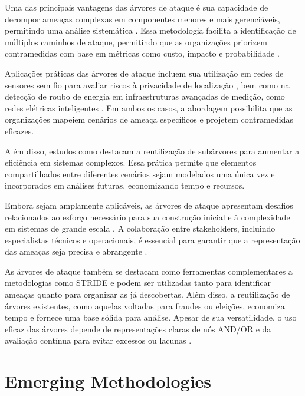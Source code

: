 Uma das principais vantagens das árvores de ataque é sua capacidade de
decompor ameaças complexas em componentes menores e mais gerenciáveis,
permitindo uma análise sistemática \cite{Energytheftdetectionissues}.
Essa metodologia facilita a identificação de múltiplos caminhos de
ataque, permitindo que as organizações priorizem contramedidas com
base em métricas como custo, impacto e probabilidade
\cite{AnAttackTreeBasedRisk}.

Aplicações práticas das árvores de ataque incluem sua utilização em
redes de sensores sem fio para avaliar riscos à privacidade de
localização \cite{AnAttackTreeBasedRisk}, bem como na detecção de
roubo de energia em infraestruturas avançadas de medição, como redes
elétricas inteligentes \cite{Energytheftdetectionissues}. Em ambos os
casos, a abordagem possibilita que as organizações mapeiem cenários de
ameaça específicos e projetem contramedidas eficazes.

Além disso, estudos como \cite{FoundationsofAttackTrees} destacam a
reutilização de subárvores para aumentar a eficiência em sistemas
complexos. Essa prática permite que elementos compartilhados entre
diferentes cenários sejam modelados uma única vez e incorporados em
análises futuras, economizando tempo e recursos.

Embora sejam amplamente aplicáveis, as árvores de ataque apresentam
desafios relacionados ao esforço necessário para sua construção
inicial e à complexidade em sistemas de grande escala
\cite{AttackTrees}. A colaboração entre stakeholders, incluindo
especialistas técnicos e operacionais, é essencial para garantir que a
representação das ameaças seja precisa e abrangente
\cite{Energytheftdetectionissues}.

As árvores de ataque também se destacam como ferramentas
complementares a metodologias como STRIDE e podem ser utilizadas tanto
para identificar ameaças quanto para organizar as já descobertas. Além
disso, a reutilização de árvores existentes, como aquelas voltadas
para fraudes ou eleições, economiza tempo e fornece uma base sólida
para análise. Apesar de sua versatilidade, o uso eficaz das árvores
depende de representações claras de nós AND/OR e da avaliação contínua
para evitar excessos ou lacunas \cite{ThreatModelingdesigningForSecurity}.

\section{Emerging Methodologies}
\label{sec:emerging_methodologies}

